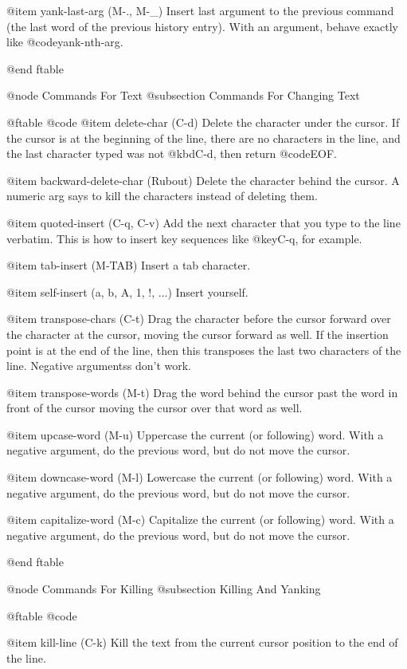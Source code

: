 {{@item yank-last-arg (M-., M-_)
Insert last argument to the previous command (the last word of the
previous history entry).  With an
argument, behave exactly like @code{yank-nth-arg}.

@end ftable

@node Commands For Text
@subsection Commands For Changing Text

@ftable @code
@item delete-char (C-d)
Delete the character under the cursor.  If the cursor is at the
beginning of the line, there are no characters in the line, and
the last character typed was not @kbd{C-d}, then return @code{EOF}.

@item backward-delete-char (Rubout)
Delete the character behind the cursor.  A numeric arg says to kill
the characters instead of deleting them.

@item quoted-insert (C-q, C-v)
Add the next character that you type to the line verbatim.  This is
how to insert key sequences like @key{C-q}, for example.

@item tab-insert (M-TAB)
Insert a tab character.

@item self-insert (a, b, A, 1, !, ...)
Insert yourself.

@item transpose-chars (C-t)
Drag the character before the cursor forward over
the character at the cursor, moving the
cursor forward as well.  If the insertion point
is at the end of the line, then this
transposes the last two characters of the line.
Negative argumentss don't work.

@item transpose-words (M-t)
Drag the word behind the cursor past the word in front of the cursor
moving the cursor over that word as well.

@item upcase-word (M-u)
Uppercase the current (or following) word.  With a negative argument,
do the previous word, but do not move the cursor.

@item downcase-word (M-l)
Lowercase the current (or following) word.  With a negative argument,
do the previous word, but do not move the cursor.

@item capitalize-word (M-c)
Capitalize the current (or following) word.  With a negative argument,
do the previous word, but do not move the cursor.

@end ftable

@node Commands For Killing
@subsection Killing And Yanking

@ftable @code

@item kill-line (C-k)
Kill the text from the current cursor position to the end of the line.

}}
